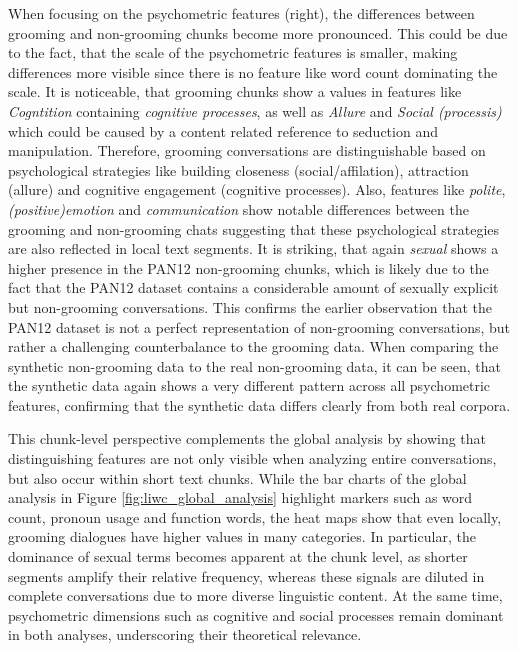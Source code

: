 When focusing on the psychometric features (right), the differences between grooming and non-grooming chunks become more pronounced. This could be due to the fact, that the scale of the psychometric features is smaller, making differences more visible since there is no feature like word count dominating the scale. It is noticeable, that grooming chunks show a values in features like \textit{Cogntition} containing \textit{cognitive processes}, as well as \textit{Allure} and \textit{Social (processis)} which could be caused by a content related reference to seduction and manipulation. Therefore, grooming conversations are distinguishable based on psychological strategies like building closeness (social/affilation), attraction (allure) and cognitive engagement (cognitive processes). Also, features like \textit{polite}, \textit{(positive)emotion} and \textit{communication} show notable differences between the grooming and non-grooming chats suggesting that these psychological strategies are also reflected in local text segments. It is striking, that again \textit{sexual} shows a higher presence in the PAN12 non-grooming chunks, which is likely due to the fact that the PAN12 dataset contains a considerable amount of sexually explicit but non-grooming conversations. This confirms the earlier observation that the PAN12 dataset is not a perfect representation of non-grooming conversations, but rather a challenging counterbalance to the grooming data. When comparing the synthetic non-grooming data to the real non-grooming data, it can be seen, that the synthetic data again shows a very different pattern across all psychometric features, confirming that the synthetic data differs clearly from both real corpora. 

This chunk-level perspective complements the global analysis by showing that distinguishing features are not only visible when analyzing entire conversations, but also occur within short text chunks. While the bar charts of the global analysis in Figure \ref{fig:liwc_global_analysis} highlight markers such as word count, pronoun usage and function words, the heat maps show that even locally, grooming dialogues have higher values in many categories. In particular, the dominance of sexual terms becomes apparent at the chunk level, as shorter segments amplify their relative frequency, whereas these signals are diluted in complete conversations due to more diverse linguistic content. At the same time, psychometric dimensions such as cognitive and social processes remain dominant in both analyses, underscoring their theoretical relevance.

